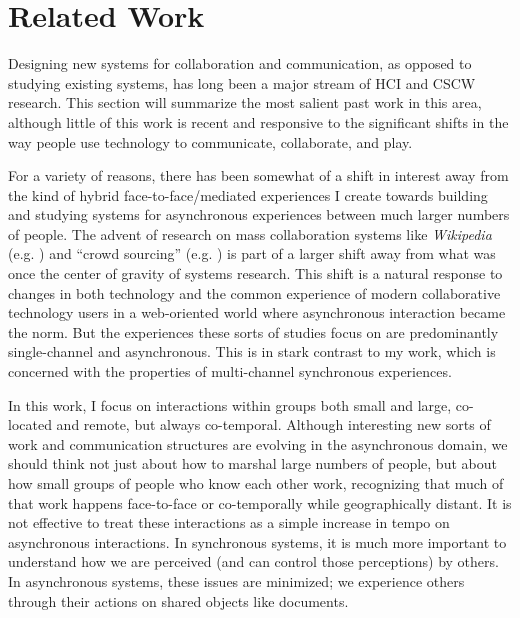 \section{Related Work}
Designing new systems for collaboration and communication, as opposed to studying existing systems, has long been a major stream of HCI and CSCW research. This section will summarize the most salient past work in this area, although little of this work is recent and responsive to the significant shifts in the way people use technology to communicate, collaborate, and play. 

For a variety of reasons, there has been somewhat of a shift in interest away from the kind of hybrid face-to-face/mediated experiences I create towards building and studying systems for asynchronous experiences between much larger numbers of people. The advent of research on mass collaboration systems like \emph{Wikipedia} (e.g. \citep{Kittur:2007up}) and ``crowd sourcing'' (e.g. \citep{Bernstein:2010wk}) is part of a larger shift away from what was once the center of gravity of systems research. This shift is a natural response to changes in both technology and the common experience of modern collaborative technology users in a web-oriented world where asynchronous interaction became the norm. But the experiences these sorts of studies focus on are predominantly single-channel and asynchronous. This is in stark contrast to my work, which is concerned with the properties of multi-channel synchronous experiences. 

In this work, I focus on interactions within groups both small and large, co-located and remote, but always co-temporal. Although interesting new sorts of work and communication structures are evolving in the asynchronous domain, we should think not just about how to marshal large numbers of people, but about how small groups of people who know each other work, recognizing that much of that work happens face-to-face or co-temporally while geographically distant. It is not effective to treat these interactions as a simple increase in tempo on asynchronous interactions. In synchronous systems, it is much more important to understand how we are perceived (and can control those perceptions) by others. In asynchronous systems, these issues are minimized; we experience others through their actions on shared objects like documents. 


